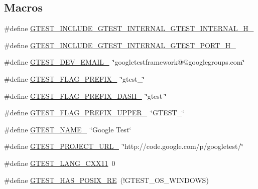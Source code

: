 \subsection*{Macros}
\begin{DoxyCompactItemize}
\item 
\#define \hyperlink{fused-src_2gtest_2gtest_8h_a508d33581439542ea940eacbf306ad2a}{G\-T\-E\-S\-T\-\_\-\-I\-N\-C\-L\-U\-D\-E\-\_\-\-G\-T\-E\-S\-T\-\_\-\-I\-N\-T\-E\-R\-N\-A\-L\-\_\-\-G\-T\-E\-S\-T\-\_\-\-I\-N\-T\-E\-R\-N\-A\-L\-\_\-\-H\-\_\-}
\item 
\#define \hyperlink{fused-src_2gtest_2gtest_8h_a6d13def13619ff1647c90e3354a65732}{G\-T\-E\-S\-T\-\_\-\-I\-N\-C\-L\-U\-D\-E\-\_\-\-G\-T\-E\-S\-T\-\_\-\-I\-N\-T\-E\-R\-N\-A\-L\-\_\-\-G\-T\-E\-S\-T\-\_\-\-P\-O\-R\-T\-\_\-\-H\-\_\-}
\item 
\#define \hyperlink{fused-src_2gtest_2gtest_8h_a21086d276b1a64d6763ee8a94b12c1b8}{G\-T\-E\-S\-T\-\_\-\-D\-E\-V\-\_\-\-E\-M\-A\-I\-L\-\_\-}~\char`\"{}googletestframework@@googlegroups.\-com\char`\"{}
\item 
\#define \hyperlink{fused-src_2gtest_2gtest_8h_a088e84784c589ba9b1fc48602ad8eabf}{G\-T\-E\-S\-T\-\_\-\-F\-L\-A\-G\-\_\-\-P\-R\-E\-F\-I\-X\-\_\-}~\char`\"{}gtest\-\_\-\char`\"{}
\item 
\#define \hyperlink{fused-src_2gtest_2gtest_8h_a4251ff898f9f94ec6b8b9402c3436759}{G\-T\-E\-S\-T\-\_\-\-F\-L\-A\-G\-\_\-\-P\-R\-E\-F\-I\-X\-\_\-\-D\-A\-S\-H\-\_\-}~\char`\"{}gtest-\/\char`\"{}
\item 
\#define \hyperlink{fused-src_2gtest_2gtest_8h_a4018b7f288f974d022df397e2730633a}{G\-T\-E\-S\-T\-\_\-\-F\-L\-A\-G\-\_\-\-P\-R\-E\-F\-I\-X\-\_\-\-U\-P\-P\-E\-R\-\_\-}~\char`\"{}G\-T\-E\-S\-T\-\_\-\char`\"{}
\item 
\#define \hyperlink{fused-src_2gtest_2gtest_8h_a13d98c217176bd8722c395b9225fc19d}{G\-T\-E\-S\-T\-\_\-\-N\-A\-M\-E\-\_\-}~\char`\"{}Google Test\char`\"{}
\item 
\#define \hyperlink{fused-src_2gtest_2gtest_8h_a5aa3c938fc1d049f1d9c5332f6a0b1d4}{G\-T\-E\-S\-T\-\_\-\-P\-R\-O\-J\-E\-C\-T\-\_\-\-U\-R\-L\-\_\-}~\char`\"{}http\-://code.\-google.\-com/p/googletest/\char`\"{}
\item 
\#define \hyperlink{fused-src_2gtest_2gtest_8h_a6e310924e9ce4a9f8fda1b189cc680c4}{G\-T\-E\-S\-T\-\_\-\-L\-A\-N\-G\-\_\-\-C\-X\-X11}~0
\item 
\#define \hyperlink{fused-src_2gtest_2gtest_8h_af5c4295ea1d76f07f65934f659792431}{G\-T\-E\-S\-T\-\_\-\-H\-A\-S\-\_\-\-P\-O\-S\-I\-X\-\_\-\-R\-E}~(!G\-T\-E\-S\-T\-\_\-\-O\-S\-\_\-\-W\-I\-N\-D\-O\-W\-S)

\end{DoxyCompactItemize}
